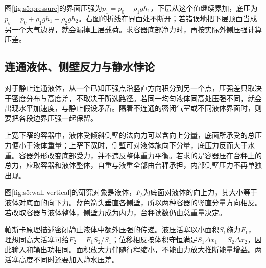 图\ref{fig:s5:pressure}的界面压强为$p_1=p_0+\rho_1gh_1$，下层从这个值继续累加，底压为$p_b=p_0+\rho_1gh_1+\rho_2gh_2$。右图的折线在界面处不断开；若错误地把下层顶面当成另一个大气边界，就会漏掉上层载荷。求容器底部净力时，再按实际外侧压强计算压差。

\subsection{连通液体、侧壁反力与静水悖论}
对于静止连通液体，从一个已知压强点沿竖直方向积分到另一个点，压强差只取决于密度分布与高度差，不取决于所选路径。若同一均匀液体同高处压强不同，就会出现水平加速度，与静止假设矛盾。隔着不连通的密闭气室或不同液体界面时，则要把各段边界压强一起保留。

上宽下窄的容器中，液体受倾斜侧壁的法向力可以含向上分量，底面所承受的总压力便小于液体重量；上窄下宽时，侧壁可对液体施向下分量，底压力反而大于水重。容器外形改变底部受力，并不违反整体重力平衡。若求的是容器压在台秤上的总力，应取容器和液体整体，自重与液重全部由台秤承担，内部侧壁压力不再单独出现。

图\ref{fig:s5:wall-vertical}的研究对象是液体，$F_b$为底面对液体的向上力，其大小等于液体对底面的向下力。蓝色箭头垂直各侧壁，所以两种容器的竖直分量方向相反。若改取容器与液体整体，侧壁力成为内力，台秤读数仍由总重量决定。


帕斯卡原理描述密闭静止液体中额外压强的传递。液压活塞以小面积$S_1$施力$F_1$，理想同高大活塞可给$F_2=F_1S_2/S_1$；位移相反按体积守恒满足$S_1\Delta x_1=S_2\Delta x_2$，因此输入和输出功相同。面积放大力伴随行程缩小，不能由力放大推断能量增益。两活塞高度不同时还要加入静水压差。


